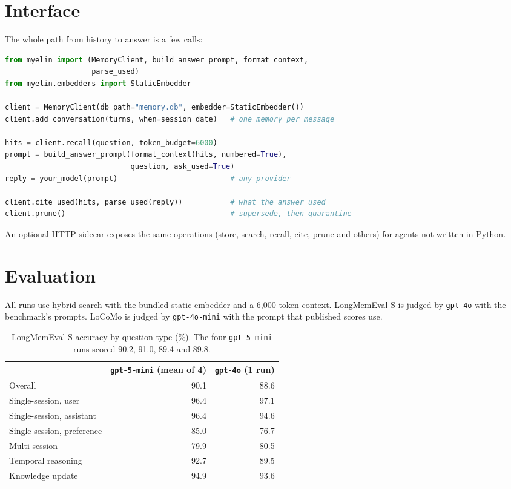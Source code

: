 \documentclass[11pt]{article}
\begin{document}
\section{Interface}

The whole path from history to answer is a few calls:

\begin{lstlisting}[language=Python]
from myelin import (MemoryClient, build_answer_prompt, format_context,
                    parse_used)
from myelin.embedders import StaticEmbedder

client = MemoryClient(db_path="memory.db", embedder=StaticEmbedder())
client.add_conversation(turns, when=session_date)   # one memory per message

hits = client.recall(question, token_budget=6000)
prompt = build_answer_prompt(format_context(hits, numbered=True),
                             question, ask_used=True)
reply = your_model(prompt)                          # any provider

client.cite_used(hits, parse_used(reply))           # what the answer used
client.prune()                                      # supersede, then quarantine
\end{lstlisting}

An optional HTTP sidecar exposes the same operations (store, search,
recall, cite, prune and others) for agents not written in Python.

\section{Evaluation}
\label{sec:eval}

All runs use hybrid search with the bundled static embedder and a
6{,}000-token context. LongMemEval-S \citep{wu2025longmemeval} is
judged by \texttt{gpt-4o} with the benchmark's prompts. LoCoMo
\citep{maharana2024locomo} is judged by \texttt{gpt-4o-mini} with the
prompt that published scores use.

\begin{table}[t]
\centering
\small
\begin{tabular}{lrr}
\toprule
 & \texttt{gpt-5-mini} (mean of 4) & \texttt{gpt-4o} (1 run) \\
\midrule
Overall & 90.1 & 88.6 \\
Single-session, user & 96.4 & 97.1 \\
Single-session, assistant & 96.4 & 94.6 \\
Single-session, preference & 85.0 & 76.7 \\
Multi-session & 79.9 & 80.5 \\
Temporal reasoning & 92.7 & 89.5 \\
Knowledge update & 94.9 & 93.6 \\
\bottomrule
\end{tabular}
\caption{LongMemEval-S accuracy by question type (\%). The four
\texttt{gpt-5-mini} runs scored 90.2, 91.0, 89.4 and 89.8.}
\label{tab:lme}
\end{table}
\end{document}
